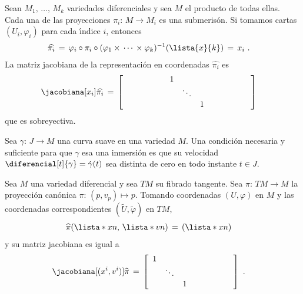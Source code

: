 \begin{ejemplo}
	Sean $M_{1},\,\dots,\,M_{k}$ variedades diferenciales y sea
	$M$ el producto de todas ellas. Cada una de las proyecciones
	$\pi_{i}:\,M\rightarrow M_{i}$ es una submeris\'{o}n. Si tomamos
	cartas $(U_{i},\varphi_{i})$ para cada \'{\i}ndice $i$, entonces
	\begin{align*}
		\widehat{\pi_{i}} & \,=\,
		\varphi_{i}\circ\pi_{i}\circ
			(\varphi_{1}\times\,\cdots\,\times\varphi_{k})^{-1}
			(\lista{x}{k})
			\,=\,x_{i}
		\text{ .}
	\end{align*}
	La matriz jacobiana de la representaci\'{o}n en coordenadas
	$\widehat{\pi_{i}}$ es
	\begin{align*}
		\jacobiana[x_{i}]{\widehat{\pi_{i}}} & \,=\,
		\sbox0{$
			\begin{matrix}
				1 & & \\
				& \ddots & \\
				& & 1
			\end{matrix}
		$}
		\sbox1{$
			\begin{matrix}
				\ddots
			\end{matrix}
		$}
		\left[
		\begin{array}{ccc}
			\vphantom{\usebox{0}}\makebox[\wd0]{} &
			\usebox{0} &
			\vphantom{\usebox{0}}\makebox[\wd0]{}
		\end{array}
		\right]
	\end{align*}
	que es sobreyectiva.
\end{ejemplo}

\begin{ejemplo}
	Sea $\gamma:\,J\rightarrow M$ una curva suave en una variedad $M$.
	Una condici\'{o}n necesaria y suficiente para que $\gamma$
	esa una inmersi\'{o}n es que su velocidad $\diferencial[t]{\gamma}=%
	\dot{\gamma}(t)$ sea distinta de cero en todo instante $t\in J$.
\end{ejemplo}

\begin{ejemplo}
	Sea $M$ una variedad diferencial y sea $TM$ su fibrado tangente.
	Sea $\pi:\,TM\rightarrow M$ la proyecci\'{o}n can\'{o}nica
	$\pi:\,(p,v_{p})\mapsto p$. Tomando coordenadas $(U,\varphi)$ en $M$ y
	las coordenadas correspondientes $(\widetilde{U},\widetilde{\varphi})$
	en $TM$,
	\begin{align*}
		\widehat{\pi}(\lista*{x}{n},\,\lista*{v}{n}) & \,=\,
			(\lista*{x}{n})
	\end{align*}
	y su matriz jacobiana es igual a
	\begin{align*}
		\jacobiana[(x^{i},v^{i})]{\widehat{\pi}} & \,=\,
		\sbox0{$
			\begin{matrix}
				1 & & \\
				& \ddots & \\
				& & 1
			\end{matrix}
		$}
		\left[
		\begin{array}{cc}
			\usebox{0} & \makebox[\wd0]{}
		\end{array}
		\right]
		\text{ .}
	\end{align*}
\end{ejemplo}

